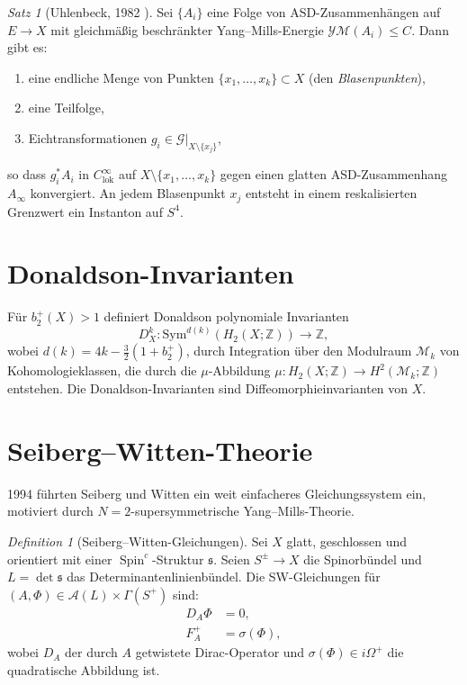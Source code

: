 \documentclass[12pt,a4paper]{amsart}
\theoremstyle{definition}
\theoremstyle{remark}
\newtheorem{satz}[theorem]{Satz}
\newtheorem{definition_de}[theorem]{Definition}
\newcommand{\ZZ}{\mathbb{Z}}
\DeclareMathOperator{\Spin}{Spin}
\begin{document}
\begin{satz}[Uhlenbeck, 1982 \cite{Uhlenbeck1982}]
Sei $\{A_i\}$ eine Folge von ASD-Zusammenhängen auf $E \to X$ mit gleichmäßig
beschränkter Yang--Mills-Energie $\mathcal{YM}(A_i) \le C$.  Dann gibt es:
\begin{enumerate}[label=(\roman*)]
  \item eine endliche Menge von Punkten $\{x_1,\ldots,x_k\} \subset X$
        (den \emph{Blasenpunkten}),
  \item eine Teilfolge,
  \item Eichtransformationen $g_i \in \mathcal{G}|_{X \setminus \{x_j\}}$,
\end{enumerate}
so dass $g_i^* A_i$ in $C^\infty_{\mathrm{lok}}$ auf
$X \setminus \{x_1,\ldots,x_k\}$ gegen einen glatten ASD-Zusammenhang
$A_\infty$ konvergiert.  An jedem Blasenpunkt $x_j$ entsteht in einem
reskalisierten Grenzwert ein Instanton auf $S^4$.
\end{satz}

\section{Donaldson-Invarianten}

Für $b_2^+(X) > 1$ definiert Donaldson polynomiale Invarianten
\[
  D_X^k \colon \mathrm{Sym}^{d(k)}(H_2(X;\ZZ)) \longrightarrow \ZZ,
\]
wobei $d(k) = 4k - \tfrac{3}{2}(1 + b_2^+)$,
durch Integration über den Modulraum $\mathcal{M}_k$ von Kohomologieklassen,
die durch die $\mu$-Abbildung $\mu \colon H_2(X;\ZZ) \to H^2(\mathcal{M}_k;\ZZ)$
entstehen.  Die Donaldson-Invarianten sind Diffeomorphieinvarianten von $X$.

\section{Seiberg--Witten-Theorie}

1994 führten Seiberg und Witten \cite{SeibergWitten1994} ein weit einfacheres
Gleichungssystem ein, motiviert durch $N{=}2$-supersymmetrische
Yang--Mills-Theorie.

\begin{definition_de}[Seiberg--Witten-Gleichungen]
Sei $X$ glatt, geschlossen und orientiert mit einer $\Spin^c$-Struktur
$\mathfrak{s}$.  Seien $S^\pm \to X$ die Spinorbündel und $L = \det\mathfrak{s}$
das Determinantenlinienbündel.  Die SW-Gleichungen für
$(A,\Phi) \in \mathcal{A}(L) \times \Gamma(S^+)$ sind:
\begin{align}
  D_A \Phi &= 0,\\
  F_A^+ &= \sigma(\Phi),
\end{align}
wobei $D_A$ der durch $A$ getwistete Dirac-Operator und
$\sigma(\Phi) \in i\Omega^+$ die quadratische Abbildung ist.
\end{definition_de}
\end{document}

